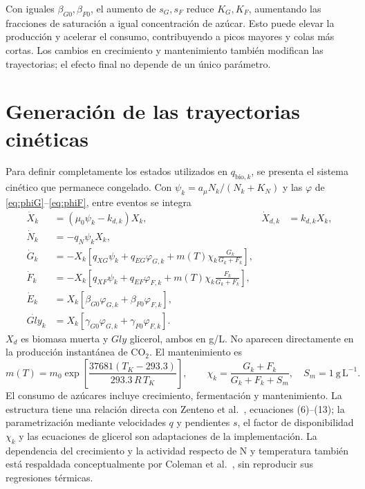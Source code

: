 \documentclass[11pt,a4paper]{article}
\begin{document}
Con iguales $\beta_{G0},\beta_{F0}$, el aumento de $s_G,s_F$ reduce
$K_G,K_F$, aumentando las fracciones de saturación a igual concentración de
azúcar. Esto puede elevar la producción y acelerar el consumo, contribuyendo
a picos mayores y colas más cortas. Los cambios en crecimiento y mantenimiento
también modifican las trayectorias; el efecto final no depende de un único
parámetro.

\section{Generación de las trayectorias cinéticas}
\label{sec:kinetics}

Para definir completamente los estados utilizados en $q_{\mathrm{bio},k}$,
se presenta el sistema cinético que permanece congelado. Con
$\psi_k=a_\mu N_k/(N_k+K_N)$ y las $\varphi$ de
\eqref{eq:phiG}--\eqref{eq:phiF}, entre eventos se integra
\begin{align}
\dot X_k&=(\mu_0\psi_k-k_{d,k})X_k,&
\dot X_{d,k}&=k_{d,k}X_k,\label{eq:biomass}\\
\dot N_k&=-q_N\psi_kX_k,\label{eq:N}\\
\dot G_k&=-X_k\left[q_{XG}\psi_k+q_{EG}\varphi_{G,k}
+m(T)\chi_k\frac{G_k}{G_k+F_k}\right],\label{eq:G}\\
\dot F_k&=-X_k\left[q_{XF}\psi_k+q_{EF}\varphi_{F,k}
+m(T)\chi_k\frac{F_k}{G_k+F_k}\right],\label{eq:F}\\
\dot E_k&=X_k[\beta_{G0}\varphi_{G,k}+\beta_{F0}\varphi_{F,k}],\label{eq:E}\\
\dot{Gly}_k&=X_k[\gamma_{G0}\varphi_{G,k}+\gamma_{F0}\varphi_{F,k}].\label{eq:Gly}
\end{align}
$X_d$ es biomasa muerta y $Gly$ glicerol, ambos en g/L. No aparecen
directamente en la producción instantánea de CO\(_2\). El mantenimiento es
\begin{equation}
m(T)=m_0\exp\left[\frac{37681(T_K-293.3)}{293.3\,R\,T_K}\right],
\qquad \chi_k=\frac{G_k+F_k}{G_k+F_k+S_m},\quad S_m=1\ \mathrm{g\,L^{-1}}.
\label{eq:maint}
\end{equation}
El consumo de azúcares incluye crecimiento, fermentación y mantenimiento.
La estructura tiene una relación directa con Zenteno et al.~\cite{zenteno2010},
ecuaciones (6)--(13); la parametrización mediante velocidades $q$ y pendientes
$s$, el factor de disponibilidad $\chi_k$ y las ecuaciones de glicerol son
adaptaciones de la implementación. La dependencia del crecimiento y la
actividad respecto de N y temperatura también está respaldada conceptualmente
por Coleman et al.~\cite{coleman2007}, sin reproducir sus regresiones térmicas.
\end{document}
